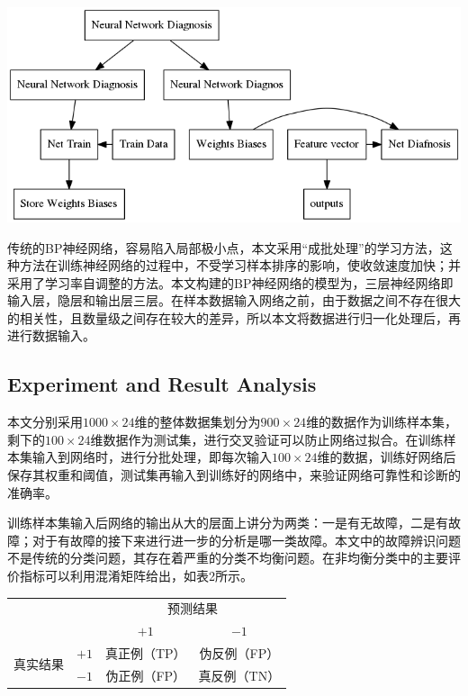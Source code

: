 \documentclass{ctacn}%
\begin{document}
\begin{multicols}{2}
\begin{center}
	\includegraphics[scale=0.3, trim=0 0 0 0]{figs/procedure}
	\label{fig2}
\end{center}

传统的BP神经网络，容易陷入局部极小点，本文采用“成批处理”的学习方法，这种方法在训练神经网络的过程中，不受学习样本排序的影响，使收敛速度加快；并采用了学习率自调整的方法。本文构建的BP神经网络的模型为，三层神经网络即输入层，隐层和输出层三层。在样本数据输入网络之前，由于数据之间不存在很大的相关性，且数量级之间存在较大的差异，所以本文将数据进行归一化处理后，再进行数据输入。

\subsection{Experiment and Result Analysis}

本文分别采用$1000\times24$维的整体数据集划分为$900\times24$维的数据作为训练样本集，剩下的$100\times24$维数据作为测试集，进行交叉验证可以防止网络过拟合。在训练样本集输入到网络时，进行分批处理，即每次输入$100\times24$维的数据，训练好网络后保存其权重和阈值，测试集再输入到训练好的网络中，来验证网络可靠性和诊断的准确率。

训练样本集输入后网络的输出从大的层面上讲分为两类：一是有无故障，二是有故障；对于有故障的接下来进行进一步的分析是哪一类故障。本文中的故障辨识问题不是传统的分类问题，其存在着严重的分类不均衡问题。在非均衡分类中的主要评价指标可以利用混淆矩阵给出，如表2所示。


\begin{center}
	\label{tab:2}
	\begin{tabular} {cccc}\toprule
		\multirow{2}{*}[-2pt]{}&\multirow{2}{*}[-2pt]{}&\multicolumn{2}{c}{预测结果}\\
		\cmidrule(lr){3-4}
		&&$+1$&$-1$\\\hline
		\multirow{2}{*}[-2pt]{真实结果}&$+1$&真正例（TP）&伪反例（FP）\\
		&$-1$&伪正例（FP）&真反例（TN）\\
		\bottomrule
\end{tabular}\end{center}


\end{multicols}
\end{document}
